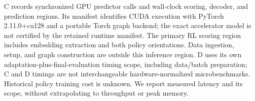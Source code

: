 C records synchronized GPU predictor calls and wall-clock scoring, decoder, and prediction regions. Its manifest identifies CUDA execution with PyTorch 2.11.0+cu128 and a portable Torch graph backend; the exact accelerator model is not certified by the retained runtime manifest. The primary RL scoring region includes embedding extraction and both policy orientations. Data ingestion, setup, and graph construction are outside this inference region. D uses its own adaptation-plus-final-evaluation timing scope, including data/batch preparation; C and D timings are not interchangeable hardware-normalized microbenchmarks. Historical policy training cost is unknown. We report measured latency and its scope, without extrapolating to throughput or peak memory.
